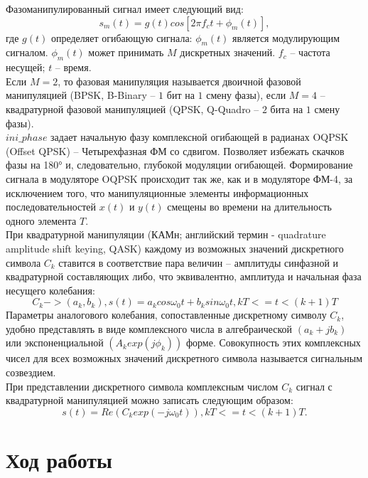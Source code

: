 \documentclass[a4paper]{article}
\begin{document}
Фазоманипулированный сигнал имеет следующий вид:
$$s_m(t)=g(t)cos[2\pi f_c t +\phi_m (t)],$$
где $g(t)$ определяет огибающую сигнала: $\phi_m (t)$ является модулирующим сигналом. $\phi_m (t)$ может принимать $M$ дискретных значений. $f_c$ -- частота несущей; $t$ -- время.\\
Если $M=2$, то фазовая манипуляция называется двоичной фазовой манипуляцией (BPSK, B-Binary -- $1$ бит на $1$ смену фазы), если $M=4$ -- квадратурной фазовой манипуляцией (QPSK, Q-Quadro -- $2$ бита на $1$ смену фазы).\\
$ini\_phase$ задает начальную фазу комплексной огибающей в радианах OQPSK (Offset QPSK) -- Четырехфазная ФМ со сдвигом. Позволяет избежать скачков фазы на 180° и, следовательно, глубокой модуляции огибающей. Формирование сигнала в модуляторе OQPSK происходит так же, как и в модуляторе ФМ-4, за исключением того, что манипуляционные элементы информационных последовательностей $x(t)$ и $y(t)$ смещены во времени на длительность одного элемента $T$.\\
При квадратурной манипуляции (КАМн; английский термин - quadrature amplitude shift keying, QASK) каждому из возможных значений дискретного символа $C_k$ ставится в соответствие пара величин -- амплитуды синфазной и квадратурной составляющих либо, что эквивалентно, амплитуда и начальная фаза несущего колебания:
$$C_k->(a_k,b_k), s(t)=a_k cos \omega_0 t+b_k sin \omega_0 t, kT<=t<(k+1)T$$
Параметры аналогового колебания, сопоставленные дискретному символу $C_k$,
удобно представлять в виде комплексного числа в алгебраической $(a_k + jb_k)$ или
экспоненциальной $(A_k exp(j \phi_k))$ форме. Совокупность этих комплексных чисел для всех возможных значений дискретного символа называется сигнальным созвездием.\\
При представлении дискретного символа комплексным числом $C_k$ сигнал с квадратурной манипуляцией можно записать следующим образом: $$s(t)=Re(C_k exp(-j \omega_0 t)), kT<=t<(k+1)T.$$
\section{Ход работы}
\end{document}
